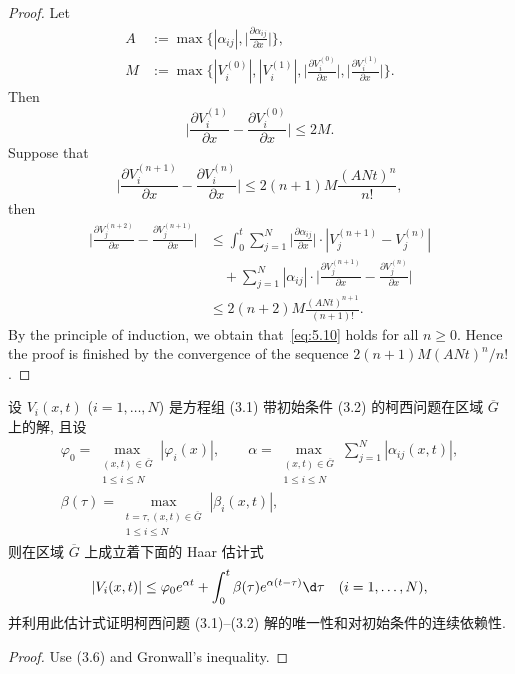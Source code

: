\begin{proof}
  Let
  \begin{align*}
    A & := \max \biggl\{|\alpha_{ij}|, \biggl|\frac{\partial\alpha_{ij}}{\partial x}\biggr|\biggr\}, \\
    M & := \max \biggl\{|V_i^{(0)}|, |V_i^{(1)}|,
                  \biggl|\frac{\partial V_i^{(0)}}{\partial x}\biggr|,
                  \biggl|\frac{\partial V_i^{(1)}}{\partial x}\biggr|\biggr\}.
  \end{align*}
  Then
  \[ \biggl|\frac{\partial V_i^{(1)}}{\partial x} - \frac{\partial V_i^{(0)}}{\partial x}\biggr|
        \leq 2M. \]
  Suppose that 
  \begin{equation}\label{eq:5.10}
    \biggl|\frac{\partial V_i^{(n+1)}}{\partial x} - \frac{\partial V_i^{(n)}}{\partial x}\biggr|
      \leq 2(n+1)M\frac{(ANt)^n}{n!},
  \end{equation}
  then
  \begin{align*}
    \biggl|\frac{\partial V_j^{(n+2)}}{\partial x} - \frac{\partial V_j^{(n+1)}}{\partial x}\biggr|
    & \leq \int_0^t \sum_{j=1}^N \biggl|\frac{\partial\alpha_{ij}}{\partial x}\biggr|
        \cdot |V_j^{(n+1)} - V_j^{(n)}| \\
    & \quad + \sum_{j=1}^N |\alpha_{ij}|
        \cdot \biggl|\frac{\partial V_j^{(n+1)}}{\partial x}-\frac{\partial V_j^{(n)}}{\partial x}\biggr| \\
    & \leq 2(n+2)M \frac{(ANt)^{n+1}}{(n+1)!}.
  \end{align*}
  By the principle of induction, we obtain that~\eqref{eq:5.10} holds for all $n\geq 0$.
  Hence the proof is finished by the convergence of the sequence
  $2(n+1)M(ANt)^n/n!$.
\end{proof}


\begin{exercise}
  设 $V_i(x,t)$ ($i=1,\ldots,N$) 是方程组 (3.1) 带初始条件 (3.2)
  的柯西问题在区域 $\overline{G}$ 上的解, 且设
  \begin{gather*}
    \varphi_0 = \max_{\substack{(x,t)\in\overline{G} \\ 1\leq i\leq N}} |\varphi_i(x)|,
    \qquad
    \alpha = \max_{\substack{(x,t)\in\overline{G} \\ 1\leq i\leq N}} \sum_{j=1}^N |\alpha_{ij}(x,t)|, \\
    \beta(\tau) = \max_{\substack{t=\tau, (x,t)\in\overline{G} \\ 1\leq i\leq N}} |\beta_i(x,t)|,
  \end{gather*}
  则在区域 $\overline{G}$ 上成立着下面的 Haar 估计式
  \[ |V_i(x,t)| \leq \varphi_0 e^{\alpha t} + \int_0^t \beta(\tau) e^{\alpha(t-\tau)} \d\tau
      \quad (i=1,\ldots,N),\]
  并利用此估计式证明柯西问题 (3.1)--(3.2) 解的唯一性和对初始条件的连续依赖性.
\end{exercise}

\begin{proof}
  Use (3.6) and Gronwall's inequality.
\end{proof}